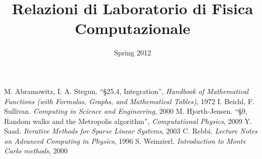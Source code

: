 \documentclass[a4paper,11pt]{report}
\title{\bfseries{\Huge{Relazioni di Laboratorio di Fisica Computazionale}}}
\author{\cursiveshape {Luca Cassia - [MAT. 728341]}}
\date{Spring 2012}
\begin{document}
\maketitle
\tableofcontents






\begin{thebibliography}{9}
 M. Abramowitz, I. A. Stegun. ``§25.4, Integration'', \textit{Handbook of Mathematical Functions (with Formulas, Graphs, and Mathematical Tables)}, 1972
 I. Beichl, F. Sullivan. \textit{Computing in Science and Engineering}, 2000
 M. Hjorth-Jensen. ``§9, Random walks and the Metropolis algorithm'', \textit{Computational Physics}, 2009
 Y. Saad. \textit{Iterative Methods for Sparse Linear Systems}, 2003
 C. Rebbi. \textit{Lecture Notes on Advanced Computing in Physics}, 1996
 S. Weinzierl. \textit{Introduction to Monte Carlo methods}, 2000
\end{thebibliography} 
\end{document}
